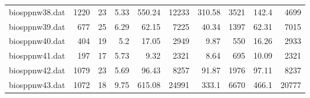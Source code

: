 \begin{center}
\begin{scriptsize}
\begin{longtable}{lrrrrrrrrr}
biosppnw38.dat & 1220 & 23 & 5.33 & 550.24 & 12233 & 310.58 & 3521 & 142.4 & 4699\\
biosppnw39.dat & 677 & 25 & 6.29 & 62.15 & 7225 & 40.34 & 1397 & 62.31 & 7015\\
biosppnw40.dat & 404 & 19 & 5.2 & 17.05 & 2949 & 9.87 & 550 & 16.26 & 2933\\
biosppnw41.dat & 197 & 17 & 5.73 & 9.32 & 2321 & 8.64 & 695 & 10.09 & 2321\\
biosppnw42.dat & 1079 & 23 & 5.69 & 96.43 & 8257 & 91.87 & 1976 & 97.11 & 8237\\
biosppnw43.dat & 1072 & 18 & 9.75 & 615.08 & 24991 & 333.1 & 6670 & 466.1 & 20777\\
\bottomrule
\end{longtable}
\end{scriptsize}
\end{center}

